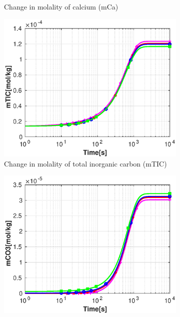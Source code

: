 \begin{figure}[!h]
\begin{subfigure}{.5\linewidth}
        \caption{\small Change in molality of calcium (mCa)}
        \label{fig:withoutvelmCa}       %
    \end{subfigure}%
        \hfill
    \begin{subfigure}{.5\linewidth}
        \centering
        \includegraphics[width=\textwidth]{PICTURES/without_vel_mTIC.eps}
        \caption{\small Change in molality of total inorganic carbon (mTIC)}
        \label{fig:withoutvelmTIC}
    \end{subfigure}%
    \hfill
    \begin{subfigure}{.5\linewidth}
        \centering
        \includegraphics[width=\textwidth]{PICTURES/without_vel_mCO3.eps}

\end{subfigure}
\end{figure}
